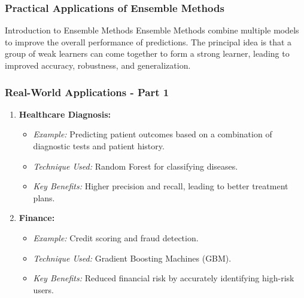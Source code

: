 \documentclass[aspectratio=169]{beamer}
\begin{document}
\begin{frame}[fragile]
    \frametitle{Practical Applications of Ensemble Methods}
    \begin{block}{Introduction to Ensemble Methods}
      Ensemble Methods combine multiple models to improve the overall performance of predictions. The principal idea is that a group of weak learners can come together to form a strong learner, leading to improved accuracy, robustness, and generalization.
    \end{block}
\end{frame}

\begin{frame}[fragile]
    \frametitle{Real-World Applications - Part 1}
    \begin{enumerate}
        \item \textbf{Healthcare Diagnosis:}
        \begin{itemize}
            \item \textit{Example:} Predicting patient outcomes based on a combination of diagnostic tests and patient history.
            \item \textit{Technique Used:} Random Forest for classifying diseases.
            \item \textit{Key Benefits:} Higher precision and recall, leading to better treatment plans.
        \end{itemize}
        
        \item \textbf{Finance:}
        \begin{itemize}
            \item \textit{Example:} Credit scoring and fraud detection.
            \item \textit{Technique Used:} Gradient Boosting Machines (GBM).
            \item \textit{Key Benefits:} Reduced financial risk by accurately identifying high-risk users.
        \end{itemize}
    \end{enumerate}
\end{frame}
\end{document}

